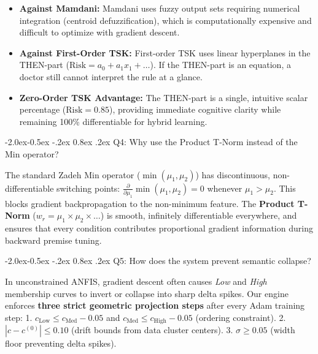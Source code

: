 \documentclass[10pt,a4paper]{article}
\makeatletter
\renewcommand\subsubsection{\@startsection{subsubsection}{3}{\z@}%
                                     {-2.0ex\@plus -0.5ex \@minus -.2ex}%
                                     {0.8ex \@plus .2ex}%
                                     {\normalfont\normalsize\bfseries\color{accent}}}
\providecommand{\tightlist}{\setlength{\itemsep}{1pt}\setlength{\parskip}{1pt}}
\makeatother
\begin{document}
\begin{itemize}
\tightlist
\item
  \textbf{Against Mamdani:} Mamdani uses fuzzy output sets requiring
  numerical integration (centroid defuzzification), which is
  computationally expensive and difficult to optimize with gradient
  descent.
\item
  \textbf{Against First-Order TSK:} First-order TSK uses linear
  hyperplanes in the THEN-part
  (\(\text{Risk} = a_0 + a_1 x_1 + \dots\)). If the THEN-part is an
  equation, a doctor still cannot interpret the rule at a glance.
\item
  \textbf{Zero-Order TSK Advantage:} The THEN-part is a single,
  intuitive scalar percentage (\(\text{Risk} = 0.85\)), providing
  immediate cognitive clarity while remaining 100\% differentiable for
  hybrid learning.
\end{itemize}

\subsubsection{Q4: Why use the Product T-Norm instead of the Min
operator?}\label{q4-why-use-the-product-t-norm-instead-of-the-min-operator}

The standard Zadeh Min operator (\(\min(\mu_1, \mu_2)\)) has
discontinuous, non-differentiable switching points:
\(\frac{\partial}{\partial \mu_1} \min(\mu_1, \mu_2) = 0\) whenever
\(\mu_1 > \mu_2\). This blocks gradient backpropagation to the
non-minimum feature. The \textbf{Product T-Norm}
(\(w_r = \mu_1 \times \mu_2 \times \dots\)) is smooth, infinitely
differentiable everywhere, and ensures that every condition contributes
proportional gradient information during backward premise tuning.

\subsubsection{Q5: How does the system prevent semantic
collapse?}\label{q5-how-does-the-system-prevent-semantic-collapse}

In unconstrained ANFIS, gradient descent often causes \emph{Low} and
\emph{High} membership curves to invert or collapse into sharp delta
spikes. Our engine enforces \textbf{three strict geometric projection
steps} after every Adam training step: 1.
\(c_{\text{Low}} \le c_{\text{Med}} - 0.05\) and
\(c_{\text{Med}} \le c_{\text{High}} - 0.05\) (ordering constraint). 2.
\(|c - c^{(0)}| \le 0.10\) (drift bounds from data cluster centers). 3.
\(\sigma \ge 0.05\) (width floor preventing delta spikes).
\end{document}
